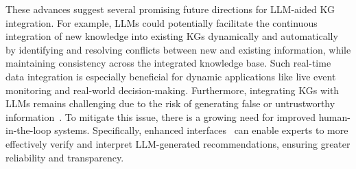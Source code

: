 These advances suggest several promising future directions for LLM-aided KG integration. For example, LLMs could potentially facilitate the continuous integration of new knowledge into existing KGs dynamically and automatically by identifying and resolving conflicts between new and existing information, while maintaining consistency across the integrated knowledge base. Such real-time data integration is especially beneficial for dynamic applications like live event monitoring and real-world decision-making. {Furthermore, integrating KGs with LLMs remains challenging due to the risk of generating false or untrustworthy information~\cite{yang2024give}. To mitigate this issue, there is a growing need for improved human-in-the-loop systems. Specifically, enhanced interfaces~\cite{hassan2017claimbuster,nakov2021automated} can enable experts to more effectively verify and interpret LLM-generated recommendations, ensuring greater reliability and transparency.}





